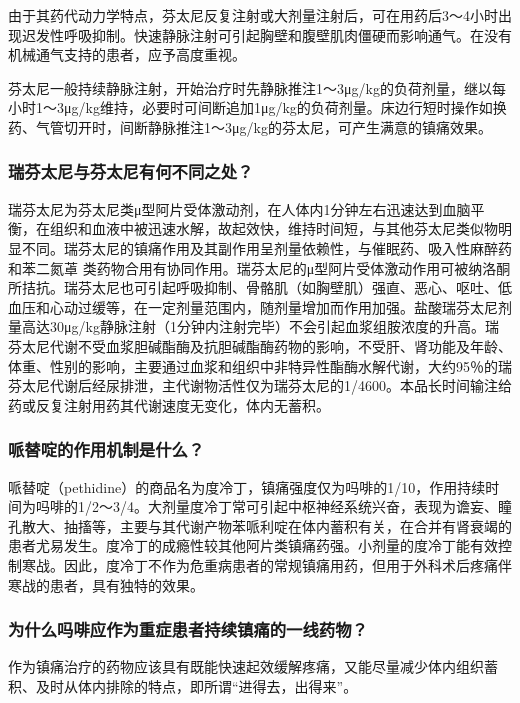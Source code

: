 由于其药代动力学特点，芬太尼反复注射或大剂量注射后，可在用药后3～4小时出现迟发性呼吸抑制。快速静脉注射可引起胸壁和腹壁肌肉僵硬而影响通气。在没有机械通气支持的患者，应予高度重视。

芬太尼一般持续静脉注射，开始治疗时先静脉推注1～3μg/kg的负荷剂量，继以每小时1～3μg/kg维持，必要时可间断追加1μg/kg的负荷剂量。床边行短时操作如换药、气管切开时，间断静脉推注1～3μg/kg的芬太尼，可产生满意的镇痛效果。

\subsubsection{瑞芬太尼与芬太尼有何不同之处？}

瑞芬太尼为芬太尼类μ型阿片受体激动剂，在人体内1分钟左右迅速达到血脑平衡，在组织和血液中被迅速水解，故起效快，维持时间短，与其他芬太尼类似物明显不同。瑞芬太尼的镇痛作用及其副作用呈剂量依赖性，与催眠药、吸入性麻醉药和苯二氮䓬
类药物合用有协同作用。瑞芬太尼的μ型阿片受体激动作用可被纳洛酮所拮抗。瑞芬太尼也可引起呼吸抑制、骨骼肌（如胸壁肌）强直、恶心、呕吐、低血压和心动过缓等，在一定剂量范围内，随剂量增加而作用加强。盐酸瑞芬太尼剂量高达30μg/kg静脉注射（1分钟内注射完毕）不会引起血浆组胺浓度的升高。瑞芬太尼代谢不受血浆胆碱酯酶及抗胆碱酯酶药物的影响，不受肝、肾功能及年龄、体重、性别的影响，主要通过血浆和组织中非特异性酯酶水解代谢，大约95％的瑞芬太尼代谢后经尿排泄，主代谢物活性仅为瑞芬太尼的1/4600。本品长时间输注给药或反复注射用药其代谢速度无变化，体内无蓄积。

\subsubsection{哌替啶的作用机制是什么？}

哌替啶（pethidine）的商品名为度冷丁，镇痛强度仅为吗啡的1/10，作用持续时间为吗啡的1/2～3/4。大剂量度冷丁常可引起中枢神经系统兴奋，表现为谵妄、瞳孔散大、抽搐等，主要与其代谢产物苯哌利啶在体内蓄积有关，在合并有肾衰竭的患者尤易发生。度冷丁的成瘾性较其他阿片类镇痛药强。小剂量的度冷丁能有效控制寒战。因此，度冷丁不作为危重病患者的常规镇痛用药，但用于外科术后疼痛伴寒战的患者，具有独特的效果。

\subsubsection{为什么吗啡应作为重症患者持续镇痛的一线药物？}

作为镇痛治疗的药物应该具有既能快速起效缓解疼痛，又能尽量减少体内组织蓄积、及时从体内排除的特点，即所谓“进得去，出得来”。

